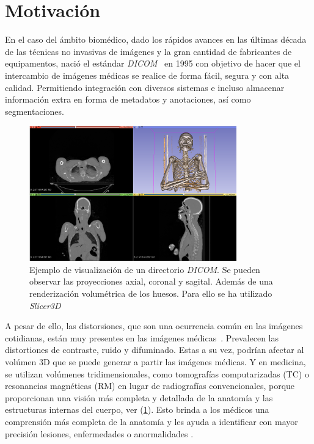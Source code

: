 
\section{Motivación}
 
En el caso del ámbito biomédico, dado los rápidos avances en las últimas década
de las técnicas no invasivas de imágenes y la gran cantidad de fabricantes 
de equipamentos, nació el estándar \emph{DICOM}~\cite{Parisot1995} en 1995 
con objetivo de hacer que el intercambio de imágenes médicas se realice de forma 
fácil, segura y con alta calidad. Permitiendo integración con diversos sistemas e 
incluso almacenar información extra en forma de metadatos y anotaciones, así como segmentaciones.
 
\begin{figure}[htp]
  \begin{center}
    \includegraphics[width=0.8\textwidth]{imagenes/Chapter1/SlicerVisualization}
  \end{center}
  \caption{Ejemplo de visualización de un directorio \emph{DICOM}. Se pueden observar
  las proyecciones axial, coronal y sagital. Además de una renderización volumétrica
  de los huesos. Para ello se ha utilizado \emph{Slicer3D}~\cite{Slicer3D}}
  \label{fig:SlicerVisualization}
\end{figure}

A pesar de ello, las distorsiones, que son una ocurrencia común en las imágenes cotidianas, 
están muy presentes en las imágenes médicas~\cite{MedicalImpactOfDistortions}.
Prevalecen las distortiones de contraste, ruido y difuminado\footnotemark[3].
Estas a su vez, podrían afectar al volúmen 3D que se puede generar a partir 
las imágenes médicas. Y en medicina, 
se utilizan volúmenes tridimensionales, como tomografías computarizadas (TC) o 
resonancias magnéticas (RM) en lugar de radiografías convencionales, porque 
proporcionan una visión más completa y detallada de la anatomía y las estructuras 
internas del cuerpo, ver (\ref{fig:SlicerVisualization}). 
Esto brinda a los médicos una comprensión más completa de la anatomía y 
les ayuda a identificar con mayor precisión lesiones, enfermedades o anormalidades
\cite{3DImagingInMedicine, 3DImagingInMedicine2, ADAS3D}.

